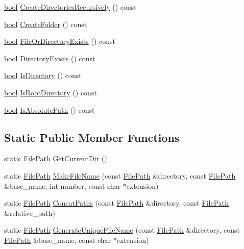 \begin{DoxyCompactItemize}
\item 
\hyperlink{classbool}{bool} \hyperlink{classtesting_1_1internal_1_1FilePath_a26790e530dd738f7fc8202c1ce718406}{Create\+Directories\+Recursively} () const
\item 
\hyperlink{classbool}{bool} \hyperlink{classtesting_1_1internal_1_1FilePath_ae3a455e7c9fc967c2443b703e958f8bd}{Create\+Folder} () const
\item 
\hyperlink{classbool}{bool} \hyperlink{classtesting_1_1internal_1_1FilePath_a105bd8fc3adff8fcb4a593532842fb68}{File\+Or\+Directory\+Exists} () const
\item 
\hyperlink{classbool}{bool} \hyperlink{classtesting_1_1internal_1_1FilePath_a74ba8435e822d77f79f137c38de9bfeb}{Directory\+Exists} () const
\item 
\hyperlink{classbool}{bool} \hyperlink{classtesting_1_1internal_1_1FilePath_a73fc042ad65e85bbecb956eb4603a6f2}{Is\+Directory} () const
\item 
\hyperlink{classbool}{bool} \hyperlink{classtesting_1_1internal_1_1FilePath_a0661adf59aec40c40c8e39b888d68142}{Is\+Root\+Directory} () const
\item 
\hyperlink{classbool}{bool} \hyperlink{classtesting_1_1internal_1_1FilePath_ae17e5581e7996021e598851fe947df9c}{Is\+Absolute\+Path} () const
\end{DoxyCompactItemize}
\subsection*{Static Public Member Functions}
\begin{DoxyCompactItemize}
\item 
static \hyperlink{classtesting_1_1internal_1_1FilePath}{File\+Path} \hyperlink{classtesting_1_1internal_1_1FilePath_aaff39ccd7bfb7a1c09c0220a64326387}{Get\+Current\+Dir} ()
\item 
static \hyperlink{classtesting_1_1internal_1_1FilePath}{File\+Path} \hyperlink{classtesting_1_1internal_1_1FilePath_aa8c102da670261eb4fa8e2f2481df139}{Make\+File\+Name} (const \hyperlink{classtesting_1_1internal_1_1FilePath}{File\+Path} \&directory, const \hyperlink{classtesting_1_1internal_1_1FilePath}{File\+Path} \&base\+\_\+name, int number, const char $\ast$extension)
\item 
static \hyperlink{classtesting_1_1internal_1_1FilePath}{File\+Path} \hyperlink{classtesting_1_1internal_1_1FilePath_ac9d57987f60ac43f0c57b89e333e531e}{Concat\+Paths} (const \hyperlink{classtesting_1_1internal_1_1FilePath}{File\+Path} \&directory, const \hyperlink{classtesting_1_1internal_1_1FilePath}{File\+Path} \&relative\+\_\+path)
\item 
static \hyperlink{classtesting_1_1internal_1_1FilePath}{File\+Path} \hyperlink{classtesting_1_1internal_1_1FilePath_a2280a77adb394cf80bb5f73fc292e8c8}{Generate\+Unique\+File\+Name} (const \hyperlink{classtesting_1_1internal_1_1FilePath}{File\+Path} \&directory, const \hyperlink{classtesting_1_1internal_1_1FilePath}{File\+Path} \&base\+\_\+name, const char $\ast$extension)
\end{DoxyCompactItemize}
